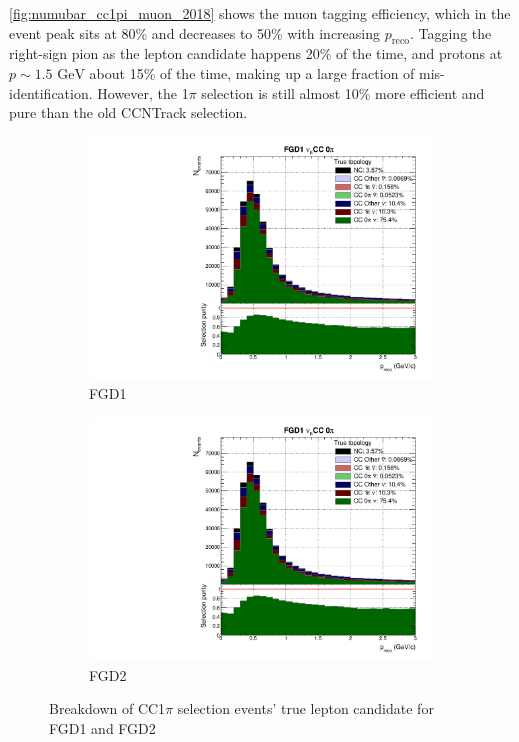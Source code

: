 \autoref{fig:numubar_cc1pi_muon_2018} shows the muon tagging efficiency, which in the event peak sits at 80\% and decreases to 50\% with increasing $p_{\text{reco}}$. Tagging the right-sign pion as the lepton candidate happens 20\% of the time, and protons at $p\sim1.5\text{ GeV}$ about 15\% of the time, making up a large fraction of mis-identification. However, the 1$\pi$ selection is still almost 10\% more efficient and pure than the old CCNTrack selection.
\begin{figure}[h]
	\begin{subfigure}[t]{0.49\textwidth}
		\includegraphics[width=\textwidth,page=16, trim={0mm 0mm 0mm 9mm}, clip]{figures/mach3/2018/Selection/2018_RedNDmatrix_rebin_verbose_may_noweights_diagnostics}
		\caption{FGD1}
	\end{subfigure}
	\begin{subfigure}[t]{0.49\textwidth}
		\includegraphics[width=\textwidth,page=22, trim={0mm 0mm 0mm 9mm}, clip]{figures/mach3/2018/Selection/2018_RedNDmatrix_rebin_verbose_may_noweights_diagnostics}
		\caption{FGD2}
	\end{subfigure}
	\caption{Breakdown of \numubar CC1$\pi$ selection events' true lepton candidate for FGD1 and FGD2}
	\label{fig:numubar_cc1pi_muon_2018}
\end{figure}

